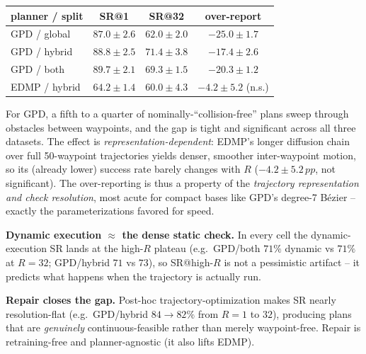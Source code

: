 \documentclass[10pt,twocolumn]{article}
\newcommand{\pp}{\,pp}
\begin{document}
\begin{center}\small
\begin{tabular}{lccc}
\toprule
planner / split & SR@1 & SR@32 & over-report \\
\midrule
GPD / global & $87.0{\pm}2.6$ & $62.0{\pm}2.0$ & $\mathbf{-25.0{\pm}1.7}$ \\
GPD / hybrid & $88.8{\pm}2.5$ & $71.4{\pm}3.8$ & $\mathbf{-17.4{\pm}2.6}$ \\
GPD / both   & $89.7{\pm}2.1$ & $69.3{\pm}1.5$ & $\mathbf{-20.3{\pm}1.2}$ \\
EDMP / hybrid & $64.2{\pm}1.4$ & $60.0{\pm}4.3$ & $-4.2{\pm}5.2$ (n.s.) \\
\bottomrule
\end{tabular}
\end{center}

\noindent For GPD, a fifth to a quarter of nominally-``collision-free'' plans sweep
through obstacles between waypoints, and the gap is tight and significant across all
three datasets. The effect is \emph{representation-dependent}: EDMP's longer diffusion
chain over full 50-waypoint trajectories yields denser, smoother inter-waypoint motion,
so its (already lower) success rate barely changes with $R$ ($-4.2{\pm}5.2\pp$, not
significant). The over-reporting is thus a property of the \emph{trajectory
representation and check resolution}, most acute for compact bases like GPD's degree-7
B\'ezier -- exactly the parameterizations favored for speed.

\noindent\textbf{Dynamic execution $\approx$ the dense static check.} In every cell the
dynamic-execution SR lands at the high-$R$ plateau (e.g.\ GPD/both $71\%$ dynamic vs
$71\%$ at $R{=}32$; GPD/hybrid $71$ vs $73$), so SR@high-$R$ is not a pessimistic
artifact -- it predicts what happens when the trajectory is actually run.

\noindent\textbf{Repair closes the gap.} Post-hoc trajectory-optimization makes SR nearly
resolution-flat (e.g.\ GPD/hybrid $84\!\to\!82\%$ from $R{=}1$ to $32$), producing plans
that are \emph{genuinely} continuous-feasible rather than merely waypoint-free. Repair is
retraining-free and planner-agnostic (it also lifts EDMP).
\end{document}
